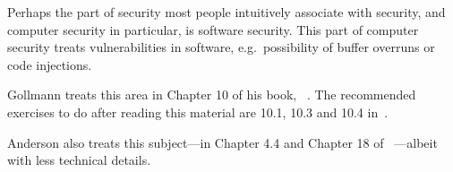 Perhaps the part of security most people intuitively associate with security, 
and computer security in particular, is software security.
This part of computer security treats vulnerabilities in software, e.g.\ 
possibility of buffer overruns or code injections.

Gollmann treats this area in Chapter 10 of his book, 
~\cite{Gollmann2011cs}.
The recommended exercises to do after reading this material are 10.1, 10.3 and 
10.4 in~\cite{Gollmann2011cs}.

Anderson also treats this subject---in Chapter 4.4 and Chapter 18 of 
\citetitle{Anderson2008sea}~\cite{Anderson2008sea}---albeit with less technical 
details.
